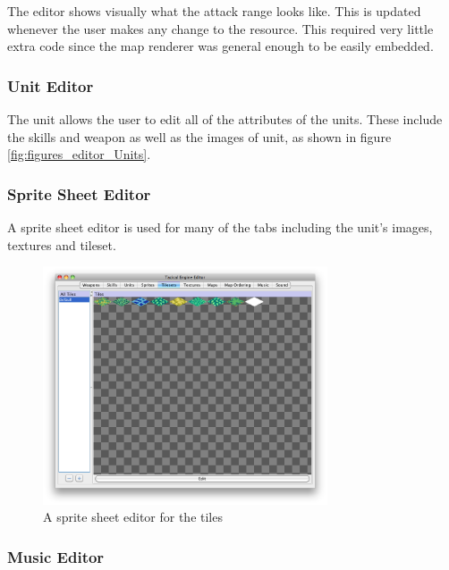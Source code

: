 The editor shows visually what the attack range looks like. This is updated whenever the user makes any change to the resource.  This required very little extra code since the map renderer was general enough to be easily embedded. 

\subsubsection{Unit Editor}
\label{ssub:unit_editors}
The unit allows the user to edit all of the attributes of the units. These include the skills and weapon as well as the images of unit, as shown in figure \ref{fig:figures_editor_Units}. 


\subsubsection{Sprite Sheet Editor}
A sprite sheet editor is used for many of the tabs including the unit's images, textures and tileset.
\begin{figure}[htbp]
	\centering
		\includegraphics[width=0.75\textwidth]{figures/editor/tileset_edit.png}
	\caption{A sprite sheet  editor for the tiles}
	\label{fig:figures_editor_tileset_edit}
\end{figure}

\subsubsection{Music Editor}
\label{ssub:music_editor}

